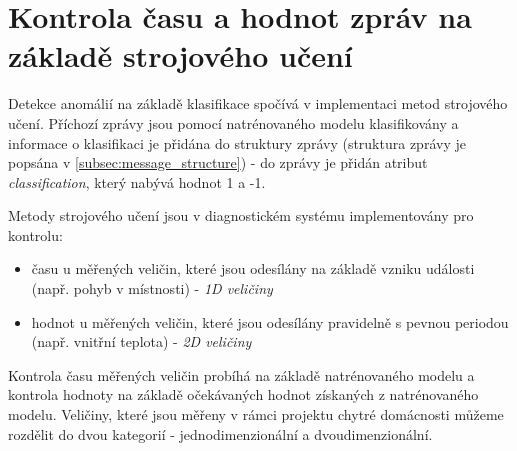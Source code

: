 \section{Kontrola času a hodnot zpráv na základě \newline strojového učení} \label{sec:classifier}
Detekce anomálií na základě klasifikace spočívá v implementaci metod strojového učení. Příchozí zprávy jsou pomocí natrénovaného modelu klasifikovány a informace o klasifikaci je přidána do struktury zprávy (struktura zprávy je popsána v \cref{subsec:message_structure}) - do zprávy je přidán atribut \textit{classification}, který nabývá hodnot 1 a -1. \par
Metody strojového učení jsou v diagnostickém systému implementovány pro kontrolu:

\begin{itemize}
	\item času u měřených veličin, které jsou odesílány na základě vzniku události (např. pohyb v místnosti) - \textit{1D veličiny}
	\item hodnot u měřených veličin, které jsou odesílány pravidelně s pevnou periodou (např. vnitřní teplota) - \textit{2D veličiny}
\end{itemize}

Kontrola času měřených veličin probíhá na základě natrénovaného modelu a kontrola hodnoty na základě očekávaných hodnot získaných z natrénovaného modelu. Veličiny, které jsou měřeny v rámci projektu chytré domácnosti můžeme rozdělit do dvou kategorií - jednodimenzionální a dvoudimenzionální.

